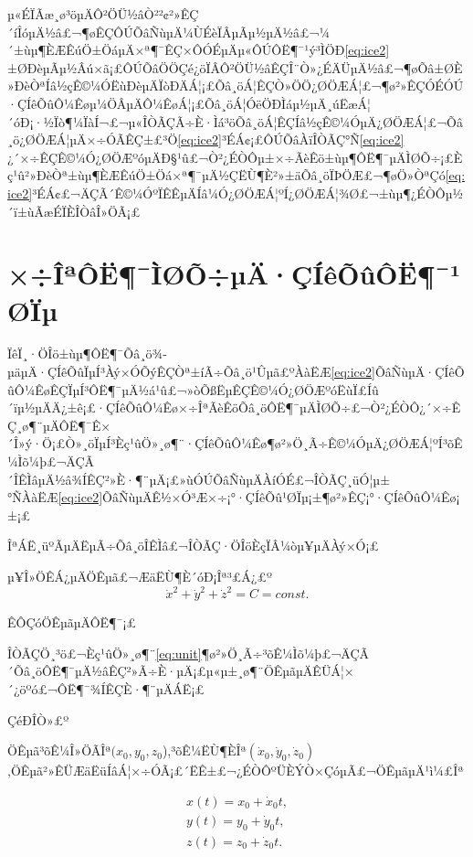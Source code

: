 \documentclass[A4,twoside]{ctexart}
\begin{document}
µ«ÉÏÃæ¸ø³öµÄÔ²ÖÜ½âÒ²²¢²»ÊÇ´íÎóµÄ½â£¬¶øÊÇÔÚÕâÑùµÄ¼ÙÉèÏÂµÃµ½µÄ½â£¬¼´±ùµ¶ÈÆÊúÖ±ÖáµÄ×ª¶¯ÊÇ×ÔÓÉµÄµ«ÔÚÔË¶¯¹ý³ÌÖÐ\eqref{eq:ice2}±ØÐèµÃµ½Âú×ã¡£ÔÚÕâÖÖÇé¿öÏÂÔ²ÖÜ½âÊÇÎ¨Ò»¿ÉÄÜµÄ½â£¬¶øÕâ±ØÈ»ÐèÒªÍâ½çÊ©¼ÓËùÐèµÄÏòÐÄÁ¦¡£Õâ¸öÁ¦ÊÇÒ»ÖÖ¿ØÖÆÁ¦£¬¶ø²»ÊÇÓÉÓÚ·ÇÍêÕûÔ¼Êøµ¼ÖÂµÄÔ¼ÊøÁ¦¡£Õâ¸öÁ¦Óë\cite{6}ÖÐÌáµ½µÄ¸úËæÁ¦´óÐ¡·½Ïò¶¼ÏàÍ¬£¬µ«ÎÒÃÇÃ÷È·Ìá³öÕâ¸öÁ¦ÊÇÍâ½çÊ©¼ÓµÄ¿ØÖÆÁ¦£¬Õâ¸ö¿ØÖÆÁ¦µÄ×÷ÓÃÊÇ±£³Ö\eqref{eq:ice2}³ÉÁ¢¡£ÔÚÕâÀïÎÒÃÇ°Ñ\eqref{eq:ice2}¿´×÷ÊÇÊ©¼Ó¿ØÖÆºóµÄÐ§¹û£¬Ò²¿ÉÒÔµ±×÷ÃèÊö±ùµ¶ÔË¶¯µÄÌØÕ÷¡£Èç¹û²»ÐèÒª±ùµ¶ÈÆÊúÖ±Öá×ª¶¯µÄ½ÇËÙ¶È²»±äÕâ¸öÏÞÖÆ£¬¶øÖ»ÒªÇó\eqref{eq:ice2}³ÉÁ¢£¬ÄÇÃ´Ê©¼ÓºÏÊÊµÄÍâ¼Ó¿ØÖÆÁ¦ºÍ¿ØÖÆÁ¦¾Ø£¬±ùµ¶¿ÉÒÔµ½´ï±ùÃæÉÏÈÎÒâÎ»ÖÃ¡£


\section{×÷ÎªÔË¶¯ÌØÕ÷µÄ·ÇÍêÕûÔË¶¯¹ØÏµ}

ÏêÏ¸·ÖÎö±ùµ¶ÔË¶¯Õâ¸ö¾­µäµÄ·ÇÍêÕûÏµÍ³Àý×ÓÕýÊÇÒª±íÃ÷Õâ¸ö¹Ûµã£ºÀàËÆ\eqref{eq:ice2}ÕâÑùµÄ·ÇÍêÕûÔ¼ÊøÊÇÏµÍ³ÔË¶¯µÄ½á¹û£¬»òÕßËµÊÇÊ©¼Ó¿ØÖÆºóËùÏ£Íû´ïµ½µÄÄ¿±ê¡£·ÇÍêÕûÔ¼Êø×÷ÎªÃèÊöÕâ¸öÔË¶¯µÄÌØÕ÷£¬Ò²¿ÉÒÔ¿´×÷ÊÇ¸ø¶¨µÄÔË¶¯Ê×´Î»ý·Ö¡£Ò»¸öÏµÍ³Èç¹ûÖ»¸ø¶¨·ÇÍêÕûÔ¼Êø¶ø²»Ö¸Ã÷Ê©¼ÓµÄ¿ØÖÆÁ¦ºÍ³õÊ¼Ìõ¼þ£¬ÄÇÃ´ÎÊÌâµÄ½â¾ÍÊÇ²»È·¶¨µÄ¡£»ùÓÚÕâÑùµÄÀíÓÉ£¬ÎÒÃÇ¸üÓ¦µ±°ÑÀàËÆ\eqref{eq:ice2}ÕâÑùµÄÊ½×Ó³Æ×÷¡°·ÇÍêÕû¹ØÏµ¡±¶ø²»ÊÇ¡°·ÇÍêÕûÔ¼Êø¡±¡£

ÎªÁË¸üºÃµÄËµÃ÷Õâ¸öÎÊÌâ£¬ÎÒÃÇ·ÖÎöÈçÏÂ¼òµ¥µÄÀý×Ó¡£

\begin{example}
\label{ex:unit}
µ¥Î»ÖÊÁ¿µÄÖÊµã£¬ÆäËÙ¶È´óÐ¡Îª³£Á¿£º
\begin{equation}
  \label{eq:unit}
  \dot{x}^2+\dot{y}^2+\dot{z}^2 = C = const.
\end{equation}

ÊÔÇóÖÊµãµÄÔË¶¯¡£


\end{example}

ÎÒÃÇÖ¸³ö£¬Èç¹ûÖ»¸ø¶¨\eqref{eq:unit}¶ø²»Ö¸Ã÷³õÊ¼Ìõ¼þ£¬ÄÇÃ´Õâ¸öÔË¶¯µÄ½âÊÇ²»Ã÷È·µÄ¡£µ«µ±¸ø¶¨ÖÊµãµÄÊÜÁ¦×´¿öºó£¬ÔË¶¯¾ÍÊÇÈ·¶¨µÄÁË¡£

ÇéÐÎÒ»£º

ÖÊµã³õÊ¼Î»ÖÃÎª$(x_0,y_0,z_0$),³õÊ¼ËÙ¶ÈÎª$(\dot{x}_0,\dot{y}_0,\dot{z}_0)$,ÖÊµã²»ÊÜÆäËüÍâÁ¦×÷ÓÃ¡£´ËÊ±£¬¿ÉÒÔºÜÈÝÒ×ÇóµÃ£¬ÖÊµãµÄ¹ì¼£Îª

\begin{eqnarray}
  \label{eq:unitsol}
  x(t) = x_0 + \dot{x}_0 t,\\
  y(t) = y_0 + \dot{y}_0 t,\\
  z(t) = z_0 + \dot{z}_0 t.
\end{eqnarray}
\end{document}

